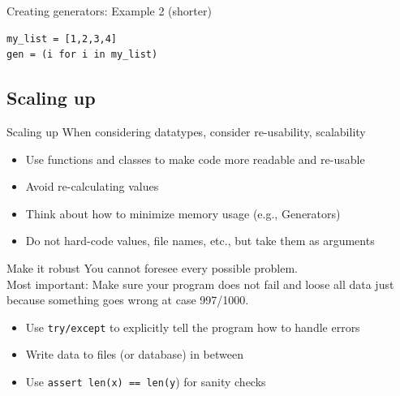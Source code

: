 \documentclass[handout]{beamer}
\begin{document}
\begin{frame}
Creating generators: Example 2 (shorter)
\begin{lstlisting}
my_list = [1,2,3,4]
gen = (i for i in my_list)
\end{lstlisting}
\end{frame}


\subsection{Scaling up}
\begin{frame}{Scaling up}
When considering datatypes, consider re-usability, scalability
	\begin{itemize}
		\item Use functions and classes to make code more readable and re-usable
		\item Avoid re-calculating values
		\item Think about how to minimize memory usage (e.g., Generators)
		\item Do not hard-code values, file names, etc., but take them as arguments
	\end{itemize}	
\end{frame}


\begin{frame}{Make it robust}
You cannot foresee every possible problem.\\
Most important: Make sure your program does not fail and loose all data just because something goes wrong at case 997/1000.
	\begin{itemize}
		\item Use \texttt{try/except} to explicitly tell the program how to handle errors
		\item Write data to files (or database) in between
		\item Use \texttt{assert len(x) == len(y}) for sanity checks
	\end{itemize}	
\end{frame}
\end{document}
